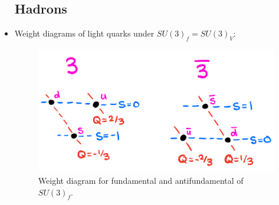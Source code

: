 \documentclass[11pt, oneside]{article}   	%
\theoremstyle{definition}
\numberwithin{equation}{subsection}		%
\begin{document}
\begin{itemize}
	\newpage
	\subsection{Hadrons}
	
	\item Weight diagrams of light quarks under $SU(3)_f = SU(3)_V$:
	\begin{figure}[H]
		\centering
		\includegraphics[width = .5\textwidth]{quark_weights}
		\caption{Weight diagram for fundamental and antifundamental of $SU(3)_f$.}
	\end{figure}
	

\end{itemize}
\end{document}
